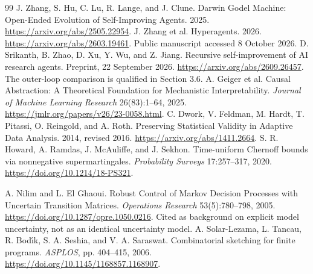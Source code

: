 \documentclass[11pt,letterpaper]{article}
\theoremstyle{plain}
\theoremstyle{definition}
\begin{document}
\begin{thebibliography}{99}
 J. Zhang, S. Hu, C. Lu, R. Lange, and J. Clune. Darwin Godel Machine: Open-Ended Evolution of Self-Improving Agents. 2025. \url{https://arxiv.org/abs/2505.22954}.
 J. Zhang et al. Hyperagents. 2026. \url{https://arxiv.org/abs/2603.19461}. Public manuscript accessed 8 October 2026.
 D. Srikanth, B. Zhao, D. Xu, Y. Wu, and Z. Jiang. Recursive self-improvement of AI research agents. Preprint, 22 September 2026. \url{https://arxiv.org/abs/2609.26457}. The outer-loop comparison is qualified in Section 3.6.
 A. Geiger et al. Causal Abstraction: A Theoretical Foundation for Mechanistic Interpretability. \emph{Journal of Machine Learning Research} 26(83):1--64, 2025. \url{https://jmlr.org/papers/v26/23-0058.html}.
 C. Dwork, V. Feldman, M. Hardt, T. Pitassi, O. Reingold, and A. Roth. Preserving Statistical Validity in Adaptive Data Analysis. 2014, revised 2016. \url{https://arxiv.org/abs/1411.2664}.
 S. R. Howard, A. Ramdas, J. McAuliffe, and J. Sekhon. Time-uniform Chernoff bounds via nonnegative supermartingales. \emph{Probability Surveys} 17:257--317, 2020. \url{https://doi.org/10.1214/18-PS321}.

 A. Nilim and L. El Ghaoui. Robust Control of Markov Decision Processes with Uncertain Transition Matrices. \emph{Operations Research} 53(5):780--798, 2005. \url{https://doi.org/10.1287/opre.1050.0216}. Cited as background on explicit model uncertainty, not as an identical uncertainty model.
 A. Solar-Lezama, L. Tancau, R. Bod\'{\i}k, S. A. Seshia, and V. A. Saraswat. Combinatorial sketching for finite programs. \emph{ASPLOS}, pp. 404--415, 2006. \url{https://doi.org/10.1145/1168857.1168907}.
\end{thebibliography}
\end{document}
